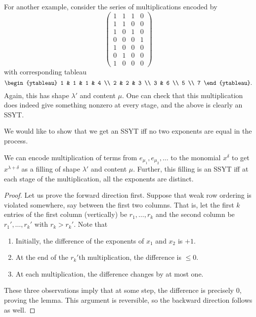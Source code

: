 \begin{fex}
		For another example, consider the series of multiplications encoded by
		\[
		\begin{pmatrix}
			1 & 1 & 1 & 0 \\
			1 & 1 & 0 & 0 \\
			1 & 0 & 1 & 0 \\
			0 & 0 & 0 & 1 \\
			1 & 0 & 0 & 0 \\
			0 & 1 & 0 & 0 \\
			1 & 0 & 0 & 0
		\end{pmatrix}
		\]
		with corresponding tableau
		\[
		\begin{ytableau}
			1 & 1 & 1 & 4 \\ 2 & 2 & 3 \\ 3 & 6 \\ 5 \\ 7
		\end{ytableau}.
		\]
		Again, this has shape $\lambda'$ and content $\mu$. One can check that this multiplication does indeed give something nonzero at every stage, and the above is clearly an SSYT.
	\end{fex}

	We would like to show that we get an SSYT iff no two exponents are equal in the process.

	\begin{flem}
		We can encode multiplication of terms from $e_{\mu_1},e_{\mu_2},\ldots$ to the monomial $x^\delta$ to get $x^{\lambda+\delta}$ as a filling of shape $\lambda'$ and content $\mu$. Further, this filling is an SSYT iff at each stage of the multiplication, all the exponents are distinct.
	\end{flem}
	\begin{proof}
		Let us prove the forward direction first. Suppose that weak row ordering is violated somewhere, say between the first two columns. That is, let the first $k$ entries of the first column (vertically) be $r_1,\ldots,r_k$ and the second column be $r_1',\ldots,r_k'$ with $r_k > r_k'$. Note that
		\begin{enumerate}[label=(\roman*)]
			\item Initially, the difference of the exponents of $x_1$ and $x_2$ is $+1$.
			\item At the end of the $r_k'$th multiplication, the difference is $\le 0$.
			\item At each multiplication, the difference changes by at most one.
		\end{enumerate}
		These three observations imply that at some step, the difference is precisely $0$, proving the lemma. This argument is reversible, so the backward direction follows as well.
	\end{proof}

